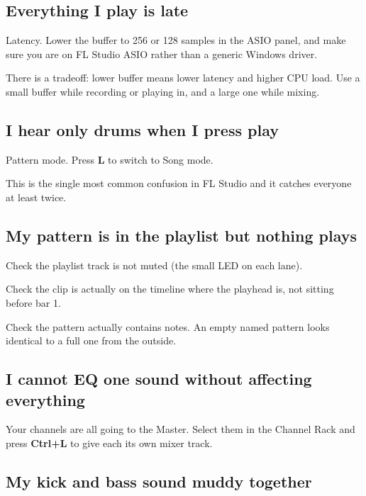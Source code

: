 \subsection{Everything I play is late}\label{fl06_trouble-everything-i-play-is-late}

Latency. Lower the buffer to 256 or 128 samples in the ASIO panel, and make sure you are on
FL Studio ASIO rather than a generic Windows driver.

There is a tradeoff: lower buffer means lower latency and higher CPU load. Use a small buffer
while recording or playing in, and a large one while mixing.

\subsection{I hear only drums when I press play}\label{fl06_trouble-i-hear-only-drums-when-i-press-play}

Pattern mode. Press \textbf{L} to switch to Song mode.

This is the single most common confusion in FL Studio and it catches everyone at least twice.

\subsection{My pattern is in the playlist but nothing plays}\label{fl06_trouble-my-pattern-is-in-the-playlist-but-nothing-plays}

Check the playlist track is not muted (the small LED on each lane).

Check the clip is actually on the timeline where the playhead is, not sitting before bar 1.

Check the pattern actually contains notes. An empty named pattern looks identical to a full
one from the outside.

\subsection{I cannot EQ one sound without affecting everything}\label{fl06_trouble-i-cannot-eq-one-sound-without-affecting-everything}

Your channels are all going to the Master. Select them in the Channel Rack and press
\textbf{Ctrl+L} to give each its own mixer track.

\subsection{My kick and bass sound muddy together}\label{fl06_trouble-my-kick-and-bass-sound-muddy-together}

